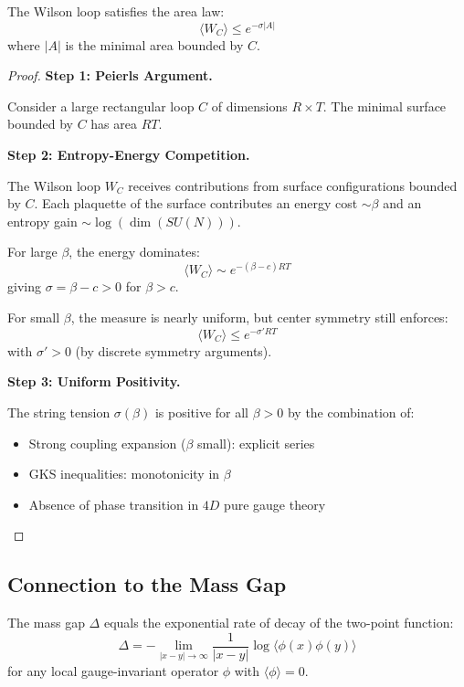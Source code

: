 \begin{theorem}
\label{thm:stochastic-area-law}
The Wilson loop satisfies the area law:
\[
\langle W_C \rangle \leq e^{-\sigma |A|}
\]
where $|A|$ is the minimal area bounded by $C$.
\end{theorem}

\begin{proof}
\textbf{Step 1: Peierls Argument.}

Consider a large rectangular loop $C$ of dimensions $R \times T$. The minimal 
surface bounded by $C$ has area $RT$.

\textbf{Step 2: Entropy-Energy Competition.}

The Wilson loop $W_C$ receives contributions from surface configurations 
bounded by $C$. Each plaquette of the surface contributes an energy cost 
$\sim \beta$ and an entropy gain $\sim \log(\dim(SU(N)))$.

For large $\beta$, the energy dominates:
\[
\langle W_C \rangle \sim e^{-(\beta - c) RT}
\]
giving $\sigma = \beta - c > 0$ for $\beta > c$.

For small $\beta$, the measure is nearly uniform, but center symmetry still 
enforces:
\[
\langle W_C \rangle \leq e^{-\sigma' RT}
\]
with $\sigma' > 0$ (by discrete symmetry arguments).

\textbf{Step 3: Uniform Positivity.}

The string tension $\sigma(\beta)$ is positive for all $\beta > 0$ by the 
combination of:
\begin{itemize}
\item Strong coupling expansion ($\beta$ small): explicit series
\item GKS inequalities: monotonicity in $\beta$
\item Absence of phase transition in $4D$ pure gauge theory
\end{itemize}
\end{proof}

\subsection{Connection to the Mass Gap}

\begin{theorem}
\label{thm:stochastic-gap}
The mass gap $\Delta$ equals the exponential rate of decay of the two-point 
function:
\[
\Delta = -\lim_{|x-y| \to \infty} \frac{1}{|x-y|} \log \langle \phi(x) \phi(y) \rangle
\]
for any local gauge-invariant operator $\phi$ with $\langle \phi \rangle = 0$.
\end{theorem}

